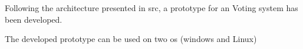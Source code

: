 
\begin{DoxyItemize}
\item Following the architecture presented in src, a prototype for an Voting system has been developed.
\begin{DoxyItemize}
\item The developed prototype can be used on two os (windows and Linux) 
\end{DoxyItemize}
\end{DoxyItemize}